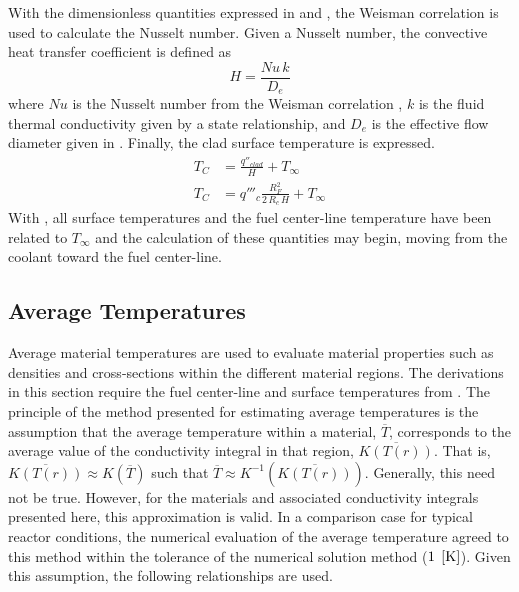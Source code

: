       With the dimensionless quantities expressed in  and
      , the Weisman correlation is used to calculate the Nusselt
      number. Given a Nusselt number, the convective heat transfer coefficient
      is defined as
      \begin{equation}
        \label{eq:hc}
        H = \frac{Nu \, k}{D_e}
      \end{equation}
      where $Nu$ is the Nusselt number from the Weisman correlation
      , $k$ is the fluid thermal conductivity given by a state
      relationship, and $D_e$ is the effective flow diameter given in
      . Finally, the clad surface temperature is expressed.
      \begin{align}
        T_C &= \frac{q''_{clad}}{H} + T_{\infty} \\
        \label{eq:tc}
        T_C &= q'''_c \frac{R_F^2}{2\,R_c\,H} + T_{\infty}
      \end{align}
      With , all surface temperatures and the fuel center-line
      temperature have been related to $T_{\infty}$ and the calculation of these
      quantities may begin, moving from the coolant toward the fuel center-line.

  \subsection{Average Temperatures}
    \label{sec:average_temps}
    Average material temperatures are used to evaluate material properties such
    as densities and cross-sections within the different material regions. The
    derivations in this section require the fuel center-line and surface
    temperatures from . The principle of the method
    presented for estimating average temperatures is the assumption that the
    average temperature within a material, $\overline{T}$, corresponds 
    to the average value of the conductivity integral in that region,
    $\overline{K(T(r))}$. That is, $\overline{K(T(r))} \approx K(\overline{T})$
    such that $\overline{T} \approx K^{-1}(\overline{K(T(r))})$.
    Generally, this need not be true. However, for the materials and associated
    conductivity integrals presented here, this approximation is valid. In a
    comparison case for typical reactor conditions, the numerical evaluation of
    the average temperature agreed to this method within the tolerance of the
    numerical solution method ($1 \;\left[\text{{K}}\right]$). Given this assumption, the
    following relationships are used.

